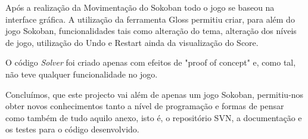 \documentclass[12pt,a4paper]{report}
\begin{document}
Após a realização da Movimentação do Sokoban todo o jogo se baseou na interface gráfica. A utilização da ferramenta Gloss permitiu criar, para além do jogo Sokoban, funcionalidades tais como alteração do tema, alteração dos níveis de jogo, utilização do Undo e Restart ainda da visualização do Score.

O código \emph{Solver} foi criado apenas com efeitos de "proof of concept" e, como tal, não teve qualquer funcionalidade no jogo. 

Concluímos, que este projecto vai além de apenas um jogo Sokoban, permitiu-nos obter novos conhecimentos tanto a nível de programação e formas de pensar como também de tudo aquilo anexo, isto é, o repositório SVN, a documentação e os testes para o código desenvolvido.
\end{document}
